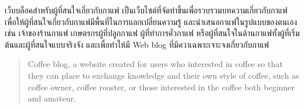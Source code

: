\maketitle
\makesignature

\ifproject
\begin{abstractTH}
เว็บบล็อคสำหรับผู้ที่สนใจเกี่ยวกับกาแฟ เป็นเว็บไซต์ที่จัดทำขึ้นเพื่อรวบรวมบทความเกี่ยวกับกาแฟ เพื่อให้ผู้ที่สนใจเกี่ยวกับกาแฟมีพื้นที่ในการแลกเปลี่ยนความรู้ และนำเสนอกาแฟในรูปแบบของตนเอง เช่น เจ้าของร้านกาแฟ เกษตรกรผู้ที่ปลูกกาแฟ ผู้ที่ทำการคั่วกาแฟ หรือผู้ที่สนใจในด้านกาแฟทั้งผู้ที่เริ่มต้นและผู้ที่สนใจแบบจริงจัง และเพื่อทำให้มี Web blog ที่มีควาเฉพาะเจาะจงเกี่ยวกับกาแฟ 
\end{abstractTH}

\begin{abstract}
 Coffee blog, a website created for users who interested in coffee so that they can place to exchange knowledge and their own style of coffee, such as coffee owner, coffee roaster, or those interested in the coffee both beginner and amateur. 


\end{abstract}





\contentspage

\ifproject
\figurelistpage

\fi %



